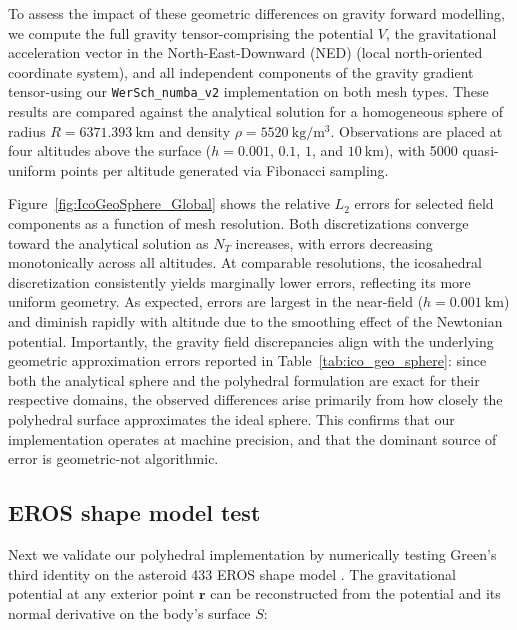 \documentclass{seg}
\begin{document}
To assess the impact of these geometric differences on gravity forward modelling, we compute the full gravity tensor-comprising the potential $V$, the gravitational acceleration vector in the North-East-Downward (NED) (local north-oriented coordinate system), and all independent components of the gravity gradient tensor-using our \texttt{WerSch\_numba\_v2} implementation on both mesh types. These results are compared against the analytical solution for a homogeneous sphere of radius $R = 6371.393~\mathrm{km}$ and density $\rho = 5520~\mathrm{kg/m^3}$. Observations are placed at four altitudes above the surface ($h = 0.001$, $0.1$, $1$, and $10~\mathrm{km}$), with 5000 quasi-uniform points per altitude generated via Fibonacci sampling.

Figure~\ref{fig:IcoGeoSphere_Global} shows the relative $L_2$ errors for selected field components as a function of mesh resolution. Both discretizations converge toward the analytical solution as $N_T$ increases, with errors decreasing monotonically across all altitudes. At comparable resolutions, the icosahedral discretization consistently yields marginally lower errors, reflecting its more uniform geometry. As expected, errors are largest in the near-field ($h = 0.001~\mathrm{km}$) and diminish rapidly with altitude due to the smoothing effect of the Newtonian potential. Importantly, the gravity field discrepancies align with the underlying geometric approximation errors reported in Table~\ref{tab:ico_geo_sphere}: since both the analytical sphere and the polyhedral formulation are exact for their respective domains, the observed differences arise primarily from how closely the polyhedral surface approximates the ideal sphere. This confirms that our implementation operates at machine precision, and that the dominant source of error is geometric-not algorithmic.

\subsection{EROS shape model test}

Next we validate our polyhedral implementation by numerically testing Green's third identity \citep{Blakely1995} on the asteroid 433 EROS shape model \citep{Gaskell2020a}. The gravitational potential at any exterior point $\mathbf{r}$ can be reconstructed from the potential and its normal derivative on the body’s surface $S$:
\end{document}
